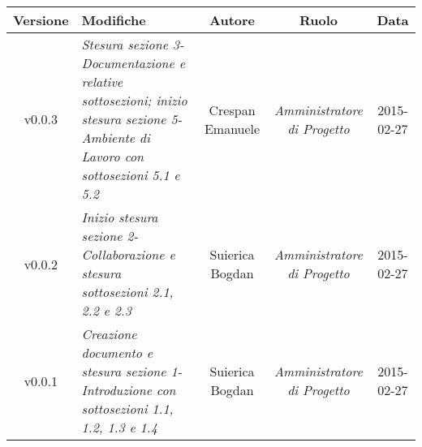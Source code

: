 \begin{table}[h]
\centering
\begin{tabular}{|c|p{}|c|c|c|}
	\toprule
		\textbf{Versione} & \textbf{Modifiche} & \textbf{Autore} & \textbf{Ruolo} & \textbf{Data} \\
	\midrule
	\midrule
		v0.0.3 & \textit{Stesura sezione 3-Documentazione e relative sottosezioni; inizio stesura sezione 5-Ambiente di Lavoro con sottosezioni 5.1 e 5.2} & Crespan Emanuele & \textit{Amministratore di Progetto} & 2015-02-27\\
	\midrule
		v0.0.2 & \textit{Inizio stesura sezione 2-Collaborazione e stesura sottosezioni 2.1, 2.2 e 2.3} & Suierica Bogdan & \textit{Amministratore di Progetto} & 2015-02-27\\
	\midrule
		v0.0.1 & \textit{Creazione documento e stesura sezione 1-Introduzione con sottosezioni 1.1, 1.2, 1.3 e 1.4} & Suierica Bogdan & \textit{Amministratore di Progetto} & 2015-02-27\\
	\bottomrule
\end{tabular}
\end{table}
\newpage
